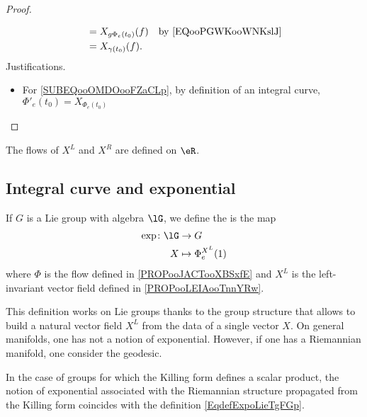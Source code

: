 \begin{proof}
\begin{subproof}
\begin{subequations}
\begin{align}
				            & =X_{g\Phi_e(t_0)}(f)                                                       & \text{by \eqref{EQooPGWKooWNKslJ}}          \\
				            & =X_{\gamma(t_0)}(f).
			\end{align}
		\end{subequations}
		Justifications.
		\begin{itemize}
			\item For \eqref{SUBEQooOMDOooFZaCLp}, by definition of an integral curve, \( \Phi'_e(t_0)=X_{\Phi_e(t_0)}\)
		\end{itemize}
	\end{subproof}
\end{proof}

\begin{proposition}
	The flows of \( X^L\) and \( X^R\) are defined on \( \eR\).
\end{proposition}

\subsection{Integral curve and exponential}

\begin{definition}     \label{DEFooOLLZooMHRgsz}
	If \( G\) is a Lie group with algebra \( \lG\), we define the  is the map
	\begin{equation}\label{EqdefExpoLieTgFGp}
		\begin{aligned}
			\exp\colon \lG & \to G                   \\
			X              & \mapsto \Phi^{X^L}_e(1)
		\end{aligned}
	\end{equation}
	where \( \Phi\) is the flow defined in \ref{PROPooJACTooXBSxfE} and \( X^L\) is the left-invariant vector field defined in \ref{PROPooLEIAooTnnYRw}.
\end{definition}

\begin{normaltext}
	This definition works on Lie groups thanks to the group structure that allows to build a natural vector field \( X^L\) from the data of a single vector \( X\). On general manifolds, one has not a notion of exponential. However, if one has a Riemannian manifold, one consider the geodesic.

	In the case of groups for which the Killing form defines a scalar product, the notion of exponential associated with the Riemannian structure propagated from the Killing form coincides with the definition \eqref{EqdefExpoLieTgFGp}.
\end{normaltext}


